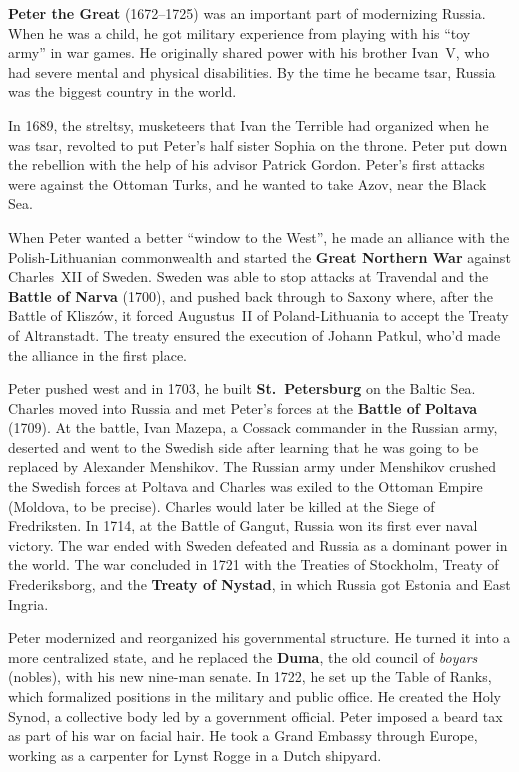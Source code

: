 \textbf{Peter the Great} (1672--1725) was an important part of modernizing Russia.
When he was a child, he got military experience from playing with his ``toy army'' in war games.
He originally shared power with his brother Ivan~V, who had severe mental and physical disabilities.
By the time he became tsar, Russia was the biggest country in the world.

In 1689, the streltsy, musketeers that Ivan the Terrible had organized when he was tsar,
revolted to put Peter's half sister Sophia on the throne.
Peter put down the rebellion with the help of his advisor Patrick Gordon.
Peter's first attacks were against the Ottoman Turks,
and he wanted to take Azov, near the Black Sea.

When Peter wanted a better ``window to the West'',
he made an alliance with the Polish-Lithuanian commonwealth
and started the \textbf{Great Northern War} against Charles~XII of Sweden.
Sweden was able to stop attacks at Travendal and the \textbf{Battle of Narva} (1700),
and pushed back through to Saxony where, after the Battle of Klisz\'ow,
it forced Augustus~II of Poland-Lithuania to accept the Treaty of Altranstadt.
The treaty ensured the execution of Johann Patkul, who'd made the alliance in the first place.

Peter pushed west and in 1703, he built \textbf{St.\ Petersburg} on the Baltic Sea.
Charles moved into Russia and met Peter's forces at the \textbf{Battle of Poltava} (1709).
At the battle, Ivan Mazepa, a Cossack commander in the Russian army,
deserted and went to the Swedish side
after learning that he was going to be replaced by Alexander Menshikov.
The Russian army under Menshikov crushed the Swedish forces at Poltava
and Charles was exiled to the Ottoman Empire (Moldova, to be precise).
Charles would later be killed at the Siege of Fredriksten.
In 1714, at the Battle of Gangut, Russia won its first ever naval victory.
The war ended with Sweden defeated and Russia as a dominant power in the world.
The war concluded in 1721 with the Treaties of Stockholm, Treaty of Frederiksborg,
and the \textbf{Treaty of Nystad}, in which Russia got Estonia and East Ingria.

Peter modernized and reorganized his governmental structure.
He turned it into a more centralized state, and he replaced the \textbf{Duma},
the old council of \textit{boyars} (nobles), with his new nine-man senate.
In 1722, he set up the Table of Ranks, which formalized positions in the military and public office.
He created the Holy Synod, a collective body led by a government official.
Peter imposed a beard tax as part of his war on facial hair.
He took a Grand Embassy through Europe, working as a carpenter for Lynst Rogge in a Dutch shipyard.

